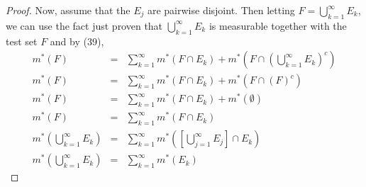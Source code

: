 \begin{pblm}
\begin{proof}
	Now, assume that the $E_j$ are pairwise disjoint. Then letting 
	$F = \bigcup\limits_{k=1}^\infty E_k$, we can use the fact just proven that 
	$\bigcup\limits_{k=1}^\infty E_k$ is measurable together with the test set $F$ and by (39), 
	\begin{equation*}
	\begin{array}{rcl}
		m^\ast(F) &=& \sum\limits_{k=1}^\infty m^\ast(F\cap E_k) + 
				m^\ast\left(F\cap\left(\bigcup\limits_{k=1}^\infty E_k\right)^c\right)\\
		m^\ast(F) &=& \sum\limits_{k=1}^\infty m^\ast(F\cap E_k) + 
				m^\ast\left(F\cap(F)^c\right)\\
		m^\ast(F) &=& \sum\limits_{k=1}^\infty m^\ast(F\cap E_k) + m^\ast(\emptyset)\\
		m^\ast(F) &=& \sum\limits_{k=1}^\infty m^\ast(F\cap E_k) \\
		m^\ast\left(\bigcup\limits_{k=1}^\infty E_k\right) &=& 
			\sum\limits_{k=1}^\infty m^\ast\left(\left[\bigcup\limits_{j=1}^\infty E_j\right] \cap E_k\right) \\
		m^\ast\left(\bigcup\limits_{k=1}^\infty E_k\right) &=& 
			\sum\limits_{k=1}^\infty m^\ast(E_k) 
	\end{array}
	\end{equation*}
\end{proof}
\end{pblm}

